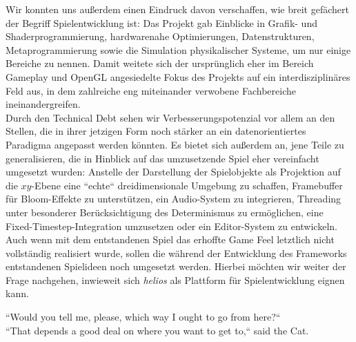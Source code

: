 Wir konnten uns außerdem einen Eindruck davon verschaffen, wie breit gefächert der Begriff Spielentwicklung ist: Das Projekt gab Einblicke in Grafik- und Shaderprogrammierung, hardwarenahe Optimierungen, Datenstrukturen, Metaprogrammierung sowie die Simulation physikalischer Systeme, um nur einige Bereiche zu nennen.
Damit weitete sich der ursprünglich eher im Bereich Gameplay und OpenGL angesiedelte Fokus des Projekts auf ein interdisziplinäres Feld aus, in dem zahlreiche eng miteinander verwobene Fachbereiche ineinandergreifen.\\

Durch den Technical Debt sehen wir Verbesserungspotenzial vor allem an den Stellen, die in ihrer jetzigen Form noch stärker an ein datenorientiertes Paradigma angepasst werden könnten.
Es bietet sich außerdem an, jene Teile zu generalisieren, die in Hinblick auf das umzusetzende Spiel eher vereinfacht umgesetzt wurden: Anstelle der Darstellung der Spielobjekte als Projektion auf die $xy$-Ebene eine ``echte`` dreidimensionale Umgebung zu schaffen, Framebuffer für Bloom-Effekte zu unterstützen, ein Audio-System zu integrieren, Threading unter besonderer Berücksichtigung des Determinismus zu ermöglichen, eine Fixed-Timestep-Integration umzusetzen oder ein Editor-System zu entwickeln.\\

Auch wenn mit dem entstandenen Spiel das erhoffte Game Feel letztlich nicht vollständig realisiert wurde, sollen die während der Entwicklung des Frameworks entstandenen Spielideen noch umgesetzt werden.
Hierbei möchten wir weiter der Frage nachgehen, inwieweit sich \textit{helios} als Plattform für Spielentwicklung eignen kann.

\vspace{25mm}
\begin{displayquote}
    ``Would you tell me, please, which way I ought to go from here{?}``\\
    ``That depends a good deal on where you want to get to,`` said the Cat.
    \par\hfill\cite{Car65}
\end{displayquote}



